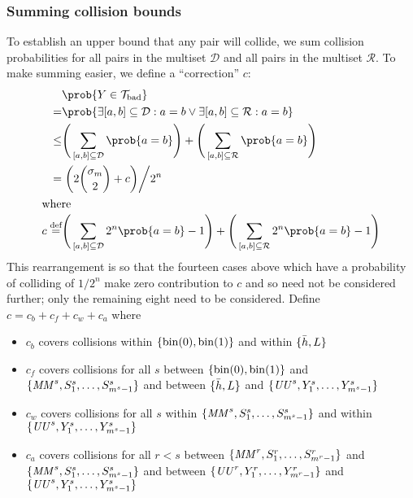 \documentclass[hctr2.tex]{subfiles}
\begin{document}
\subsubsection{Summing collision bounds}
To establish an upper bound that any pair will collide,
we sum collision probabilities
for all pairs in the multiset \(\mathcal{D}\)
and all pairs in the multiset \(\mathcal{R}\).
To make summing easier, we define a ``correction'' \(c\):
\begin{align*}
    & \prob{Y \in \Tb} \\
    = &\prob{\exists [a, b] \subseteq \mathcal{D}: a = b \vee \exists [a, b] \subseteq \mathcal{R} : a = b} \\
    \leq &
        \Bigg(\sum_{[a, b] \subseteq \mathcal{D}} \prob{a = b}\Bigg)
      + \Bigg(\sum_{[a, b] \subseteq \mathcal{R}} \prob{a = b}\Bigg)
      \\
    = &\left.\left(2\binom{\sigma_m}{2} + c
    \right)\middle/2^n\right. \\
    \intertext{where}
    c \defeq &
    \Bigg(\sum_{[a, b] \subseteq \mathcal{D}} 2^n\prob{a = b} -1\Bigg)
    + \Bigg(\sum_{[a, b] \subseteq \mathcal{R}} 2^n\prob{a = b} -1\Bigg)
\end{align*}
This rearrangement is so that the fourteen cases above
which have a probability of colliding of \(1/2^n\)
make zero contribution to \(c\)
and so need not be considered further;
only the remaining eight
need to be considered. Define
\(c = c_b + c_f + c_w + c_a\) where
\begin{itemize}
    \item \(c_b\) covers collisions within 
    \(\{\operatorname{bin}(0), \operatorname{bin}(1)\}\) and within \(\{\bar{h}, L\}\)
    \item \(c_f\) covers collisions
    for all \(s\)
    between \(\{\operatorname{bin}(0), \operatorname{bin}(1)\}\) and \(\{\mathit{MM}^s, S_1^s, \ldots, S_{m^s-1}^s\}\)
    and between \(\{\bar{h}, L\}\) and \(\{\mathit{UU}^s, Y_1^s, \ldots, Y_{m^s-1}^s\}\)
    \item \(c_w\) covers collisions
    for all \(s\)
    within \(\{\mathit{MM}^s, S_1^s, \ldots, S_{m^s-1}^s\}\)
    and within \(\{\mathit{UU}^s, Y_1^s, \ldots, Y_{m^s-1}^s\}\)
    \item \(c_a\) covers collisions
    for all \(r < s\)
    between \(\{\mathit{MM}^r, S_1^r, \ldots, S_{m^r-1}^r\}\) and \(\{\mathit{MM}^s, S_1^s, \ldots, S_{m^s-1}^s\}\)
    and between \(\{\mathit{UU}^r, Y_1^r, \ldots, Y_{m^r-1}^r\}\) and \(\{\mathit{UU}^s, Y_1^s, \ldots, Y_{m^s-1}^s\}\)
\end{itemize}
\end{document}
